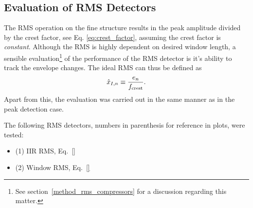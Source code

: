 \documentclass[../main2.tex]{subfiles}
\begin{document}
\subsection{Evaluation of RMS Detectors}\label{method_rms_detectors}
The RMS operation on the fine structure results in the peak amplitude divided by the crest factor, see Eq. \eqref{eq:crest_factor}, assuming the crest factor is \emph{constant}. Although the RMS is highly dependent on desired window length, a sensible evaluation\footnote{See section~\ref{method_rms_compressors} for a discussion regarding this matter.} of the performance of the RMS detector is it's ability to track the envelope changes. The ideal RMS can thus be defined as
\begin{align}
\hat{x}_{I,n} \equiv \frac{e_n}{f_\text{crest}} \label{eq:ideal_rms}.
\end{align}
Apart from this, the evaluation was carried out in the same manner as in the peak detection case.

The following RMS detectors, numbers in parenthesis for reference in plots, were tested:
\begin{itemize}
\item (1) IIR RMS, Eq.~\eqref{}
\item  (2) Window RMS, Eq.~\eqref{}
\end{itemize}
\end{document}
